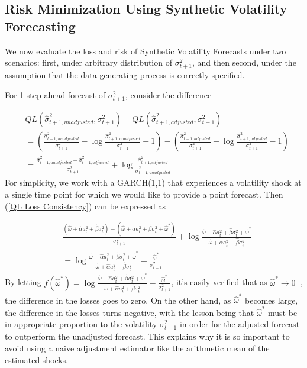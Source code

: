 \documentclass[11pt]{article}
\theoremstyle{definition}
\begin{document}
\subsection{Risk Minimization Using Synthetic Volatility Forecasting}

We now evaluate the loss and risk of Synthetic Volatility Forecasts under two scenarios: first, under arbitrary distribution of $\sigma^{2}_{t+1}$, and then second, under the assumption that the data-generating process is correctly specified.

For 1-step-ahead forecast of $\sigma^{2}_{t+1}$, consider the difference 

\begin{align}
  & QL(\hat\sigma_{t+1, unadjusted}^{2},\sigma^{2}_{t+1})-QL(\hat\sigma^{2}_{t+1, adjusted},\sigma^{2}_{t+1})\\
   & =(\frac{\hat\sigma^{2}_{t+1,unadjusted}}{\sigma_{t+1}^{2}} - \log{\frac{\hat\sigma^{2}_{t+1,unadjusted}}{\sigma_{t+1}^{2}}} - 1) - (\frac{\hat\sigma^{2}_{t+1,adjusted}}{\sigma_{t+1}^{2}} - \log{\frac{\hat\sigma^{2}_{t+1,adjusted}}{\sigma_{t+1}^{2}}} - 1)\\
   & = \frac{\hat\sigma^{2}_{t+1,unadjusted}-\hat\sigma^{2}_{t+1,adjusted}}{\sigma_{t+1}^{2}} + \log{\frac{\hat\sigma^{2}_{t+1,adjusted}}{\hat\sigma^{2}_{t+1,unadjusted}}}\label{QL Loss Consistency}
\end{align}
For simplicity, we work with a GARCH(1,1) that experiences a volatility shock at a single time point for which we would like to provide a point forecast.  Then (\ref{QL Loss Consistency}) can be expressed as

\begin{align}
   &\frac{(\hat\omega + \hat\alpha a_{t}^{2} + \hat\beta\sigma^{2}_{t})-(\hat\omega + \hat\alpha a_{t}^{2} + \hat\beta\sigma_{t}^{2} + \hat\omega^{*})}{\sigma_{t+1}^{2}} + \log{\frac{\hat\omega + \hat\alpha a_{t}^{2} + \hat\beta\sigma_{t}^{2} + \hat\omega^{*}}{\hat\omega + \hat\alpha a_{t}^{2} + \hat\beta\sigma_{t}^{2}}}\\
   & = \log{\frac{\hat\omega + \hat\alpha a_{t}^{2} + \hat\beta\sigma_{t}^{2} + \hat\omega^{*}}{\hat\omega + \hat\alpha a_{t}^{2} + \hat\beta\sigma_{t}^{2}}} - \frac{\hat\omega^{*}}{\sigma^{2}_{t+1}} \label{QL Loss Consistency - GARCH(1,1)} 
\end{align}
By letting $f(\hat\omega^{*}) = \log{\frac{\hat\omega + \hat\alpha a_{t}^{2} + \hat\beta\sigma_{t}^{2} + \hat\omega^{*}}{\hat\omega + \hat\alpha a_{t}^{2} + \hat\beta\sigma_{t}^{2}}} - \frac{\hat\omega^{*}}{\sigma^{2}_{t+1}}$, it's easily verified that as $\hat\omega^{*} \rightarrow 0^{+}$, the difference in the losses goes to zero.  On the other hand, as $\hat\omega^{*}$ becomes large, the difference in the losses turns negative, with the lesson being that $\hat\omega^{*}$ must be in appropriate proportion to the volatility $\sigma^{2}_{t+1}$ in order for the adjusted forecast to outperform the unadjusted forecast.  This explains why it is so important to avoid using a naive adjustment estimator like the arithmetic mean of the estimated shocks.  
\end{document}

